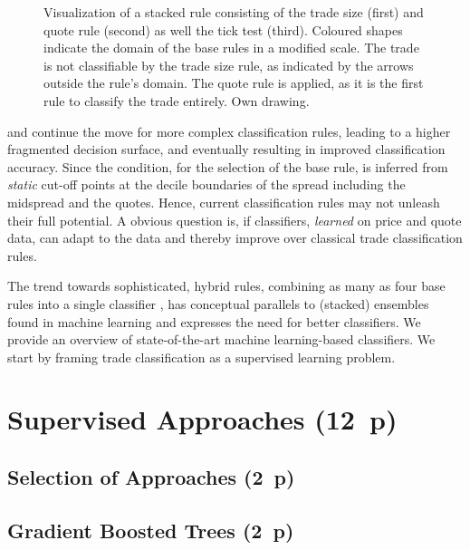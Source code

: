 \begin{figure}[ht!]
\centering

\caption[Visualization Of A Stacked Rule]{Visualization of a stacked rule consisting of the trade size (first) and quote rule (second) as well the tick test (third). Coloured shapes indicate the domain of the base rules in a modified scale. The trade is not classifiable by the trade size rule, as indicated by the arrows outside the rule's domain. The quote rule is applied, as it is the first rule to classify the trade entirely. Own drawing.}
\label{fig:stacking-algo}
\end{figure}

\textcite[][3811]{chakrabartyTradeClassificationAlgorithms2007} and \textcite[][18]{grauerOptionTradeClassification2022} continue the move for more complex classification rules, leading to a higher fragmented decision surface, and eventually resulting in improved classification accuracy. Since the condition, for the selection of the base rule, is inferred from \emph{static} cut-off points at the decile boundaries of the spread including the midspread and the quotes. Hence, current classification rules may not unleash their full potential. A obvious question is, if classifiers, \emph{learned} on price and quote data, can adapt to the data and thereby improve over classical trade classification rules.

The trend towards sophisticated, hybrid rules, combining as many as four base rules into a single classifier \autocite[cp.][18]{grauerOptionTradeClassification2022}, has conceptual parallels to (stacked) ensembles found in machine learning and expresses the need for better classifiers. We provide an overview of state-of-the-art machine learning-based classifiers. We start by framing trade classification as a supervised learning problem.

\newpage
\section{Supervised Approaches (12~p)}\label{sec:supervised-approaches}

\subsection{Selection of Approaches (2~p)}\label{sec:selection-of-approaches}

\subsection{Gradient Boosted Trees (2~p)}\label{sec:gradient-boosted-trees}

